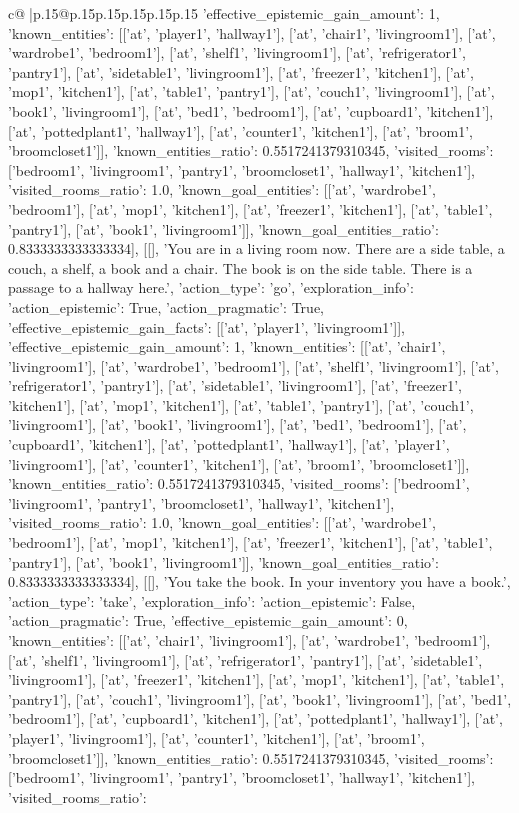 \documentclass{article}
\begin{document}
{\begin{supertabular}{c@{$\;$}|p{.15\linewidth}@{}p{.15\linewidth}p{.15\linewidth}p{.15\linewidth}p{.15\linewidth}p{.15\linewidth}}
{{{'effective_epistemic_gain_amount': 1, 'known_entities': [['at', 'player1', 'hallway1'], ['at', 'chair1', 'livingroom1'], ['at', 'wardrobe1', 'bedroom1'], ['at', 'shelf1', 'livingroom1'], ['at', 'refrigerator1', 'pantry1'], ['at', 'sidetable1', 'livingroom1'], ['at', 'freezer1', 'kitchen1'], ['at', 'mop1', 'kitchen1'], ['at', 'table1', 'pantry1'], ['at', 'couch1', 'livingroom1'], ['at', 'book1', 'livingroom1'], ['at', 'bed1', 'bedroom1'], ['at', 'cupboard1', 'kitchen1'], ['at', 'pottedplant1', 'hallway1'], ['at', 'counter1', 'kitchen1'], ['at', 'broom1', 'broomcloset1']], 'known_entities_ratio': 0.5517241379310345, 'visited_rooms': ['bedroom1', 'livingroom1', 'pantry1', 'broomcloset1', 'hallway1', 'kitchen1'], 'visited_rooms_ratio': 1.0, 'known_goal_entities': [['at', 'wardrobe1', 'bedroom1'], ['at', 'mop1', 'kitchen1'], ['at', 'freezer1', 'kitchen1'], ['at', 'table1', 'pantry1'], ['at', 'book1', 'livingroom1']], 'known_goal_entities_ratio': 0.8333333333333334}}], [[], 'You are in a living room now. There are a side table, a couch, a shelf, a book and a chair. The book is on the side table. There is a passage to a hallway here.', {'action_type': 'go', 'exploration_info': {'action_epistemic': True, 'action_pragmatic': True, 'effective_epistemic_gain_facts': [['at', 'player1', 'livingroom1']], 'effective_epistemic_gain_amount': 1, 'known_entities': [['at', 'chair1', 'livingroom1'], ['at', 'wardrobe1', 'bedroom1'], ['at', 'shelf1', 'livingroom1'], ['at', 'refrigerator1', 'pantry1'], ['at', 'sidetable1', 'livingroom1'], ['at', 'freezer1', 'kitchen1'], ['at', 'mop1', 'kitchen1'], ['at', 'table1', 'pantry1'], ['at', 'couch1', 'livingroom1'], ['at', 'book1', 'livingroom1'], ['at', 'bed1', 'bedroom1'], ['at', 'cupboard1', 'kitchen1'], ['at', 'pottedplant1', 'hallway1'], ['at', 'player1', 'livingroom1'], ['at', 'counter1', 'kitchen1'], ['at', 'broom1', 'broomcloset1']], 'known_entities_ratio': 0.5517241379310345, 'visited_rooms': ['bedroom1', 'livingroom1', 'pantry1', 'broomcloset1', 'hallway1', 'kitchen1'], 'visited_rooms_ratio': 1.0, 'known_goal_entities': [['at', 'wardrobe1', 'bedroom1'], ['at', 'mop1', 'kitchen1'], ['at', 'freezer1', 'kitchen1'], ['at', 'table1', 'pantry1'], ['at', 'book1', 'livingroom1']], 'known_goal_entities_ratio': 0.8333333333333334}}], [[], 'You take the book. In your inventory you have a book.', {'action_type': 'take', 'exploration_info': {'action_epistemic': False, 'action_pragmatic': True, 'effective_epistemic_gain_amount': 0, 'known_entities': [['at', 'chair1', 'livingroom1'], ['at', 'wardrobe1', 'bedroom1'], ['at', 'shelf1', 'livingroom1'], ['at', 'refrigerator1', 'pantry1'], ['at', 'sidetable1', 'livingroom1'], ['at', 'freezer1', 'kitchen1'], ['at', 'mop1', 'kitchen1'], ['at', 'table1', 'pantry1'], ['at', 'couch1', 'livingroom1'], ['at', 'book1', 'livingroom1'], ['at', 'bed1', 'bedroom1'], ['at', 'cupboard1', 'kitchen1'], ['at', 'pottedplant1', 'hallway1'], ['at', 'player1', 'livingroom1'], ['at', 'counter1', 'kitchen1'], ['at', 'broom1', 'broomcloset1']], 'known_entities_ratio': 0.5517241379310345, 'visited_rooms': ['bedroom1', 'livingroom1', 'pantry1', 'broomcloset1', 'hallway1', 'kitchen1'], 'visited_rooms_ratio': }}}
\end{supertabular}}
\end{document}
